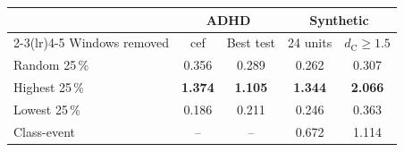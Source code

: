 \setlength{\tabcolsep}{2pt}\begin{tabular*}{\columnwidth}{@{\extracolsep{\fill}}lcccc}
\toprule
 & \multicolumn{2}{c}{ADHD} & \multicolumn{2}{c}{Synthetic} \\
\cmidrule(lr){2-3}\cmidrule(lr){4-5}
Windows removed & cef & Best test & 24 units & $d_{\mathrm{C}}\geq1.5$ \\
\midrule
Random 25\,\% & 0.356 & 0.289 & 0.262 & 0.307 \\
Highest 25\,\% & \textbf{1.374} & \textbf{1.105} & \textbf{1.344} & \textbf{2.066} \\
Lowest 25\,\% & 0.186 & 0.211 & 0.246 & 0.363 \\
Class-event & -- & -- & 0.672 & 1.114 \\
\bottomrule
\end{tabular*}
